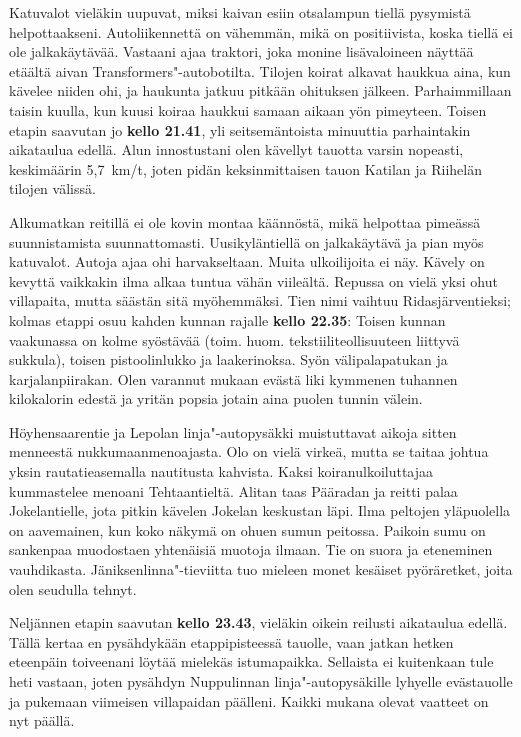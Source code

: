 \begin{multicols}{2}
Katuvalot vieläkin uupuvat, miksi kaivan esiin otsalampun tiellä pysymistä helpottaakseni. Autoliikennettä on vähemmän, mikä on positiivista, koska tiellä ei ole jalkakäytävää. Vastaani ajaa traktori, joka monine lisävaloineen näyttää etäältä aivan Transformers"-autobotilta. Tilojen koirat alkavat haukkua aina, kun kävelee niiden ohi, ja haukunta jatkuu pitkään ohituksen jälkeen. Parhaimmillaan taisin kuulla, kun kuusi koiraa haukkui samaan aikaan yön pimeyteen. Toisen etapin saavutan jo \textbf{kello 21.41}, yli seitsemäntoista minuuttia parhaintakin aikataulua edellä. Alun innostustani olen kävellyt tauotta varsin nopeasti, keskimäärin 5,7~km/t, joten pidän keksinmittaisen tauon Katilan ja Riihelän tilojen välissä.

Alkumatkan reitillä ei ole kovin montaa käännöstä, mikä helpottaa pimeässä suunnistamista suunnattomasti. Uusikyläntiellä on jalkakäytävä ja pian myös katuvalot. Autoja ajaa ohi harvakseltaan. Muita ulkoilijoita ei näy. Kävely on kevyttä vaikkakin ilma alkaa tuntua vähän viileältä. Repussa on vielä yksi ohut villapaita, mutta säästän sitä myöhemmäksi. Tien nimi vaihtuu Ridasjärventieksi; kolmas etappi osuu kahden kunnan rajalle \textbf{kello 22.35}: Toisen kunnan vaakunassa on kolme syöstävää (toim. huom. tekstiiliteollisuuteen liittyvä sukkula), toisen pistoolinlukko ja laakerinoksa. Syön välipalapatukan ja karjalanpiirakan. Olen varannut mukaan evästä liki kymmenen tuhannen kilokalorin edestä ja yritän popsia jotain aina puolen tunnin välein.

Höyhensaarentie ja Lepolan linja"-autopysäkki muistuttavat aikoja sitten menneestä nukkumaanmenoajasta. Olo on vielä virkeä, mutta se taitaa johtua yksin rautatieasemalla nautitusta kahvista. Kaksi koiranulkoiluttajaa kummastelee menoani Tehtaantieltä. Alitan taas Pääradan ja reitti palaa Jokelantielle, jota pitkin kävelen Jokelan keskustan läpi. Ilma peltojen yläpuolella on aavemainen, kun koko näkymä on ohuen sumun peitossa. Paikoin sumu on sankenpaa muodostaen yhtenäisiä muotoja ilmaan. Tie on suora ja eteneminen vauhdikasta. Jäniksenlinna"-tieviitta tuo mieleen monet kesäiset pyöräretket, joita olen seudulla tehnyt. 

Neljännen etapin saavutan \textbf{kello 23.43}, vieläkin oikein reilusti aikataulua edellä. Tällä kertaa en pysähdykään etappipisteessä tauolle, vaan jatkan hetken eteenpäin toiveenani löytää mielekäs istumapaikka. Sellaista ei kuitenkaan tule heti vastaan, joten pysähdyn Nuppulinnan linja"-autopysäkille lyhyelle evästauolle ja pukemaan viimeisen villapaidan päälleni. Kaikki mukana olevat vaatteet on nyt päällä.


\end{multicols}

